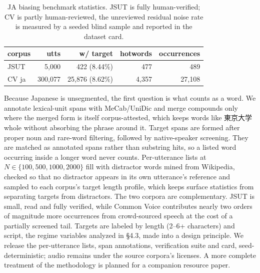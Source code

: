 \documentclass{article}
\begin{document}
\begin{table}[htb]
\centering
\caption{JA biasing benchmark statistics. JSUT is fully human-verified; CV is partly human-reviewed, the unreviewed residual noise rate is measured by a seeded blind sample and reported in the dataset card.}
\label{tab:bench}
\footnotesize
\setlength{\tabcolsep}{4.5pt}
\begin{tabular}{lrrrr}
\toprule
corpus & utts & w/ target & hotwords & occurrences \\
\midrule
JSUT     & 5,000   & 422 (8.44\%)    & 477   & 489    \\
CV ja & 300,077 & 25,876 (8.62\%) & 4,357 & 27,108 \\
\bottomrule
\end{tabular}
\end{table}


Because Japanese is unsegmented, the first question is what counts as a word. We annotate lexical-unit spans with MeCab/UniDic and merge compounds only where the merged form is itself corpus-attested, which keeps words like 東京大学 whole without absorbing the phrase around it. Target spans are formed after proper noun and rare-word filtering, followed by native-speaker screening. They are matched as annotated spans rather than substring hits, so a listed word occurring inside a longer word never counts. Per-utterance lists at $N \in \{100, 500, 1000, 2000\}$ fill with distractor words mined from Wikipedia, checked so that no distractor appears in its own utterance's reference and sampled to each corpus's target length profile, which keeps surface statistics from separating targets from distractors. The two corpora are complementary. JSUT is small, read and fully verified, while Common Voice contributes nearly two orders of magnitude more occurrences from crowd-sourced speech at the cost of a partially screened tail. Targets are labeled by length (2–6+ characters) and script, the regime variables analyzed in §4.3, made into a design principle. We release the per-utterance lists, span annotations, verification suite and card, seed-deterministic; audio remains under the source corpora's licenses. A more complete treatment of the methodology is planned for a companion resource paper.

\end{document}

